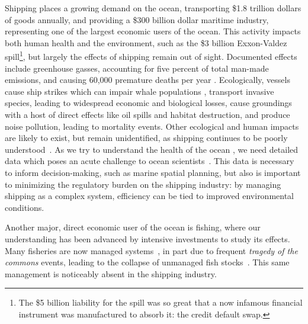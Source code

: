 \documentclass[12pt,letterpaper]{article}
\begin{document}
Shipping places a growing demand on the ocean, transporting \$1.8 trillion dollars of goods annually, %
and providing a \$300 billion dollar maritime industry, representing one of the largest economic users of the ocean. This activity impacts both human health and the environment, such as the \$3 billion Exxon-Valdez spill\footnote{The \$5 billion liability for the spill was so great that a now infamous financial instrument was manufactured to absorb it: the credit default swap.}, but largely the effects of shipping remain out of sight. Documented effects include greenhouse gasses, accounting for five percent of total man-made emissions, and causing 60,000 premature deaths per year \citep{Corbett2007}. Ecologically, vessels cause ship strikes which can impair whale populations \citep{Fujiwara2001}, %
 transport invasive species, leading to widespread economic and biological losses, cause groundings with a host of direct effects like oil spills and habitat destruction, and produce noise pollution, leading to mortality events. Other ecological and human impacts are likely to exist, but remain unidentified, as shipping continues to be poorly understood~\citep{Davenport2006}. As we try to understand the health of the ocean \citep{Halpern2012}, we need detailed data which poses an acute challenge to ocean scientists~\citep{Wright1997}. This data is necessary to inform decision-making, such as marine spatial planning, but also is important to minimizing the regulatory burden on the shipping industry: by managing shipping as a complex system, efficiency can be tied to improved environmental conditions.


Another major, direct economic user of the ocean is fishing, where our understanding has been advanced by intensive investments to study its effects. %
Many fisheries are now managed systems~\citep{worm2009rebuilding}, in part due to frequent \textit{tragedy of the commons} events, leading to the collapse of unmanaged fish stocks~\citep{costello2012status}. %
This same management is noticeably absent in the shipping industry.
\end{document}
